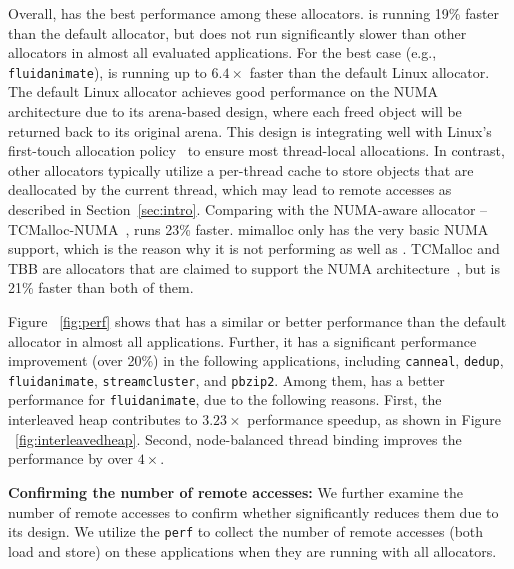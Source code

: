 Overall, \NM{} has the best performance among these allocators. \NM{} is running 19\% faster than the default allocator, but does not run significantly slower than other allocators in almost all evaluated applications. For the best case (e.g., \texttt{fluidanimate}), \NM{} is running up to $6.4\times$ faster than the default Linux allocator.  The default Linux allocator achieves good performance on the NUMA architecture due to its arena-based design, where each freed object will be returned back to its original arena.
This design is integrating well with Linux's first-touch allocation policy~\cite{Lameter:2013:NO:2508834.2513149} to ensure most thread-local allocations. 
In contrast, other allocators typically utilize a per-thread cache to store objects that are deallocated by the current thread, which may lead to remote accesses as described in Section~\ref{sec:intro}.  Comparing with the NUMA-aware allocator -- TCMalloc-NUMA~\cite{tcmallocnew}, \NM{} runs 23\% faster. 
mimalloc only has the very basic NUMA support, which is the reason why it is not performing as well as \NM{}. TCMalloc and TBB are allocators that are claimed to support the NUMA architecture~\cite{tcmalloc2, tbb3}, but \NM{} is 21\% faster than both of them.


Figure ~\ref{fig:perf} shows that \NM{} has a similar or better performance than the default allocator in almost all applications. Further, it has a significant performance improvement (over 20\%) in the following applications, including \texttt{canneal}, \texttt{dedup}, \texttt{fluidanimate}, \texttt{streamcluster}, and \texttt{pbzip2}. Among them, \NM{} has a better performance for \texttt{fluidanimate}, due to the following reasons. First, the interleaved heap contributes to $3.23\times$ performance speedup, as shown in Figure ~\ref{fig:interleavedheap}. Second, node-balanced thread binding improves the performance by over $4\times$. 

\textbf{Confirming the number of remote accesses:} We further examine the number of remote accesses to confirm whether \NM{} significantly reduces them due to its design. We utilize the \texttt{perf} to collect the number of remote accesses (both load and store) on these applications when they are running with all allocators. 

